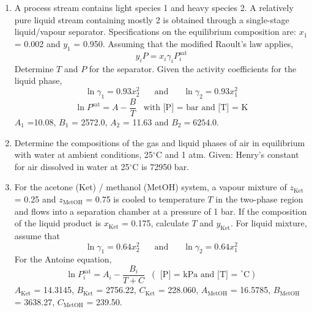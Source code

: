 \documentclass[12pts,a4paper,amsmath,amssymb,floatfix]{article}%
\newcommand{\frc}{\displaystyle\frac}
\begin{document}
\begin{enumerate}[label=\bfseries Problem \arabic*:]
\item\label{Tut05P2} A process stream contains light species 1 and heavy species 2. A relatively pure liquid stream containing mostly 2 is obtained through a single-stage liquid/vapour separator. Specifications on the equilibrium composition are: $x_{1}$ = 0.002 and $y_{1}$ = 0.950. Assuming that the modified Raoult's law applies, 
\begin{displaymath}
  y_{i} P = x_{i}\gamma_{i}P_{i}^{\text{sat}}
\end{displaymath} 
Determine $T$ and $P$ for the separator. Given the activity coefficients for the liquid phase,
\begin{displaymath}
\ln\gamma_{1} = 0.93x_{2}^{2} \;\;\;\;\;\text{ and }\;\;\;\;\;\ln\gamma_{2}=0.93x_{1}^{2}
\end{displaymath}
\begin{displaymath}
\ln P^{\text{sat}} = A - \frc{B}{T}\;\;\;\text{with [P] = bar and [T] = K}
\end{displaymath} 
$A_{1}$ =10.08, $B_{1}$ = 2572.0, $A_{2}$ = 11.63 and $B_{2}=6254.0$.

\item\label{Tut05P4} Determine the compositions of the gas and liquid phases of air in equilibrium with water at ambient conditions, 25$^{\circ}$C and 1 atm. Given: Henry's constant for air dissolved in water at 25$^{\circ}$C is 72950 bar. 

\item\label{SMVN} For the acetone (Ket) / methanol (MetOH) system, a vapour mixture of $z_{\text{Ket}}$ = 0.25 and $z_{\text{MetOH}}$ = 0.75 is cooled to temperature $T$ in the two-phase region and flows into a separation chamber at a pressure of 1 bar. If the composition of the liquid product is $x_{\text{Ket}}$ = 0.175, calculate $T$  and $y_{\text{Ket}}$. For liquid mixture, assume that
\begin{displaymath}
\ln\gamma_{1} = 0.64x_{2}^{2} \;\;\;\;\;\text{ and }\;\;\;\;\;\ln\gamma_{2}=0.64x_{1}^{2}
\end{displaymath}
For the Antoine equation, 
\begin{displaymath}
\ln P_{i}^{\text{sat}} = A_{i} - \frc{B_{i}}{T + C} \;\;\left(\text{ [P] = kPa and [T] = }^{\circ}\text{C}\right)
\end{displaymath}
$A_{\text{Ket}}$ = 14.3145, $B_{\text{Ket}}$ = 2756.22, $C_{\text{Ket}}$ = 228.060, $A_{\text{MetOH}}$ = 16.5785, $B_{\text{MetOH}}$ = 3638.27, $C_{\text{MetOH}}$ = 239.50.


\end{enumerate} 
\end{document}
